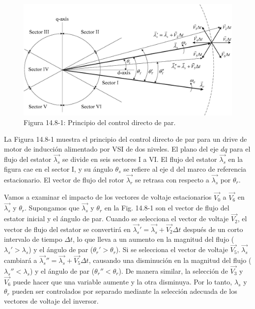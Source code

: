 \documentclass[letterpaper,12pt]{article}
\begin{document}
\begin{figure}[ht]
\centering
\includegraphics[scale=0.9]{graficos/img23.jpg}
\caption{Figura 14.8-1: Principio del control directo de par.}
\label{fig:14.8-1}
\end{figure}
\FloatBarrier

La Figura 14.8-1 muestra el principio del control directo de par para un drive de motor de inducción alimentado por VSI de dos niveles. El plano del eje $dq$ para el flujo del estator $\vec{\lambda_s}$ se divide en seis sectores I a VI. El flujo del estator $\vec{\lambda_s}$ en la figura cae en el sector I, y su ángulo $\theta_s$ se refiere al eje d del marco de referencia estacionario. El vector de flujo del rotor $\vec{\lambda_r}$ se retrasa con respecto a $\vec{\lambda_s}$ por $\theta_r$.

Vamos a examinar el impacto de los vectores de voltaje estacionarios $\vec{V_0}$ a $\vec{V_6}$ en $\vec{\lambda_s}$ y $\theta_r$. Supongamos que $\vec{\lambda_s}$ y $\theta_r$ en la Fig. 14.8-1 son el vector de flujo del estator inicial y el ángulo de par. Cuando se selecciona el vector de voltaje $\vec{V_2}$, el vector de flujo del estator se convertirá en $\vec{\lambda_s}' = \vec{\lambda_s} + \vec{V_2}\Delta t$ después de un corto intervalo de tiempo $\Delta t$, lo que lleva a un aumento en la magnitud del flujo ($\lambda_s' > \lambda_s$) y el ángulo de par ($\theta_r' > \theta_r$). Si se selecciona el vector de voltaje $\vec{V_5}$, $\vec{\lambda_s}$ cambiará a $\vec{\lambda_s}'' = \vec{\lambda_s} + \vec{V_5}\Delta t$, causando una disminución en la magnitud del flujo ($\lambda_s'' < \lambda_s$) y el ángulo de par ($\theta_r'' < \theta_r$). De manera similar, la selección de $\vec{V_3}$ y $\vec{V_6}$ puede hacer que una variable aumente y la otra disminuya. Por lo tanto, $\lambda_s$ y $\theta_r$ pueden ser controlados por separado mediante la selección adecuada de los vectores de voltaje del inversor.
\end{document}
